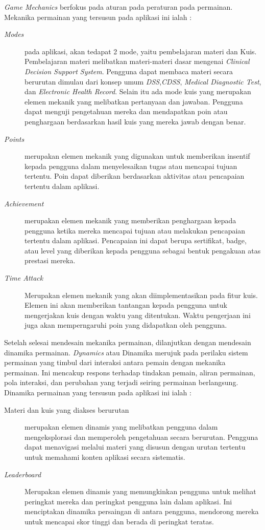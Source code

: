 \textit{Game Mechanics} berfokus pada aturan pada peraturan pada permainan. Mekanika permainan yang tersusun pada aplikasi ini ialah :
\begin{description}
	\item[\textit{Modes}]
	pada aplikasi, akan tedapat 2 mode, yaitu pembelajaran materi dan Kuis.
	Pembelajaran materi melibatkan materi-materi dasar mengenai \textit{Clinical Decision Support System}. Pengguna dapat membaca materi secara berurutan dimulau dari konsep umum \textit{DSS},\textit{CDSS}, \textit{Medical Diagnostic Test}, dan \textit{Electronic Health Record}.
	Selain itu ada mode kuis yang
	merupakan elemen mekanik yang melibatkan pertanyaan dan jawaban. Pengguna dapat menguji pengetahuan mereka dan mendapatkan poin atau penghargaan berdasarkan hasil kuis yang mereka jawab dengan benar.
	\item[\textit{Points}] merupakan elemen mekanik yang digunakan untuk memberikan insentif kepada pengguna dalam menyelesaikan tugas atau mencapai tujuan tertentu. Poin dapat diberikan berdasarkan aktivitas atau pencapaian tertentu dalam aplikasi.
	\item[\textit{Achievement}] merupakan elemen mekanik yang memberikan penghargaan kepada pengguna ketika mereka mencapai tujuan atau melakukan pencapaian tertentu dalam aplikasi. Pencapaian ini dapat berupa sertifikat, badge, atau level yang diberikan kepada pengguna sebagai bentuk pengakuan atas prestasi mereka.
	\item[\textit{Time Attack}] Merupakan elemen mekanik yang akan diimplementasikan pada fitur kuis. Elemen ini akan memberikan tantangan kepada pengguna untuk mengerjakan kuis dengan waktu yang ditentukan. Waktu pengerjaan ini juga akan memperngaruhi poin yang didapatkan oleh pengguna.
\end{description}
Setelah selesai mendesain mekanika permainan, dilanjutkan dengan mendesain dinamika permainan. \textit{Dynamics} atau Dinamika merujuk pada perilaku sistem permainan yang timbul dari interaksi antara pemain dengan mekanika permainan. Ini mencakup respons terhadap tindakan pemain, aliran permainan, pola interaksi, dan perubahan yang terjadi seiring permainan berlangsung. Dinamika permainan yang tersusun pada aplikasi ini ialah : 
\begin{description}
	\item[{Materi dan kuis yang diakses berurutan}] merupakan elemen dinamis yang melibatkan pengguna dalam mengeksplorasi dan memperoleh pengetahuan secara berurutan. Pengguna dapat menavigasi melalui materi yang disusun dengan urutan tertentu untuk memahami konten aplikasi secara sistematis.
	\item[\textit{Leaderboard}] Merupakan elemen dinamis yang memungkinkan pengguna untuk melihat peringkat mereka dan peringkat pengguna lain dalam aplikasi. Ini menciptakan dinamika persaingan di antara pengguna, mendorong mereka untuk mencapai skor tinggi dan berada di peringkat teratas.
\end{description}
